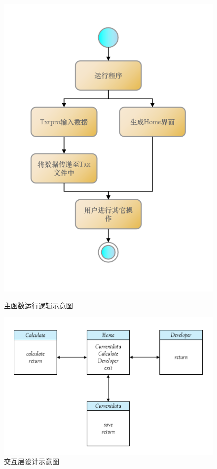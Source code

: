 \documentclass[a4paper, utf8]{ctexart}
\begin{document}
    \begin{figure}[htbp]
        \begin{minipage}{.4\linewidth}
            \centering
            \includegraphics[height=.2\textheight]{./figure/Entrance.png}
            \caption{主函数运行逻辑示意图}
        \end{minipage}
        \begin{minipage}{.6\linewidth}
            \centering
            \includegraphics[height=.2\textheight]{./figure/Windows.png}
            \caption{交互层设计示意图}
        \end{minipage}
    \end{figure}
\end{document}
